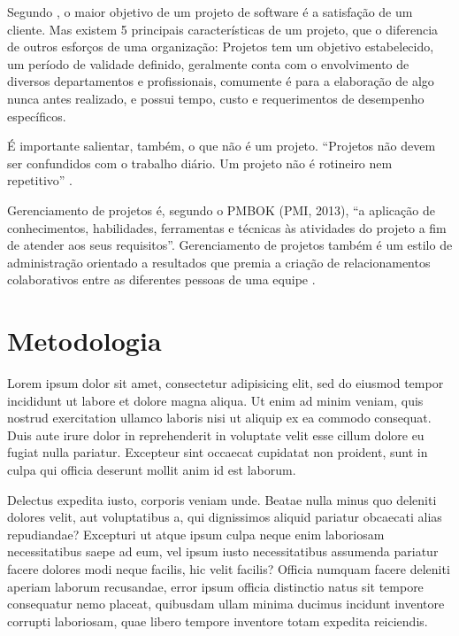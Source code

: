 \documentclass[
    12pt,               %
    openright,          %
    twoside,            %
    a4paper,            %
    chapter=TITLE,     %
    english,            %
    spanish,            %
    portuguese              %
    ]{abntex2}
\begin{document}
Segundo , o maior objetivo de um projeto de software é a satisfação de um cliente. Mas existem 5 principais características de um projeto, que o diferencia de outros esforços de uma organização: Projetos tem um objetivo estabelecido, um período de validade definido, geralmente conta com o envolvimento de diversos departamentos e profissionais, comumente é para a elaboração de algo nunca antes realizado, e possui tempo, custo e requerimentos de desempenho específicos.


É importante salientar, também, o que não é um projeto. \textquotedblleft{}Projetos não devem ser confundidos com o trabalho diário. Um projeto não é rotineiro nem repetitivo\textquotedblright{} \cite[p.~6]{grayLarson2009}.


Gerenciamento de projetos é, segundo o PMBOK (PMI, 2013), \textquotedblleft{}a aplicação de conhecimentos, habilidades, ferramentas e técnicas às atividades do projeto a fim de atender aos seus requisitos\textquotedblright{}. Gerenciamento de projetos também é um estilo de administração orientado a resultados que premia a criação de relacionamentos colaborativos entre as diferentes pessoas de uma equipe \cite[p.~3]{grayLarson2009}.



\chapter{Metodologia}

Lorem ipsum dolor sit amet, consectetur adipisicing elit, sed do eiusmod tempor incididunt ut labore et dolore magna aliqua. Ut enim ad minim veniam, quis nostrud exercitation ullamco laboris nisi ut aliquip ex ea commodo consequat. Duis aute irure dolor in reprehenderit in voluptate velit esse cillum dolore eu fugiat nulla pariatur. Excepteur sint occaecat cupidatat non proident, sunt in culpa qui officia deserunt mollit anim id est laborum.


Delectus expedita iusto, corporis veniam unde. Beatae nulla minus quo deleniti dolores velit, aut voluptatibus a, qui dignissimos aliquid pariatur obcaecati alias repudiandae? Excepturi ut atque ipsum culpa neque enim laboriosam necessitatibus saepe ad eum, vel ipsum iusto necessitatibus assumenda pariatur facere dolores modi neque facilis, hic velit facilis? Officia numquam facere deleniti aperiam laborum recusandae, error ipsum officia distinctio natus sit tempore consequatur nemo placeat, quibusdam ullam minima ducimus incidunt inventore corrupti laboriosam, quae libero tempore inventore totam expedita reiciendis.
\end{document}
